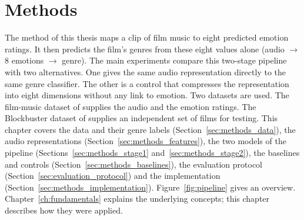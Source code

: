 \chapter{Methods}
\label{ch:methods}

The method of this thesis maps a clip of film music to eight predicted emotion ratings. It then predicts the film's genres from these eight values alone (audio $\rightarrow$ 8 emotions $\rightarrow$ genre). The main experiments compare this two-stage pipeline with two alternatives. One gives the same audio representation directly to the same genre classifier. The other is a control that compresses the representation into eight dimensions without any link to emotion. Two datasets are used. The film-music dataset of \citet{eerola2011comparison} supplies the audio and the emotion ratings. The Blockbuster dataset of \citet{ma2021computational} supplies an independent set of films for testing. This chapter covers the data and their genre labels (Section~\ref{sec:methods_data}), the audio representations (Section~\ref{sec:methods_features}), the two models of the pipeline (Sections~\ref{sec:methods_stage1} and~\ref{sec:methods_stage2}), the baselines and controls (Section~\ref{sec:methods_baselines}), the evaluation protocol (Section~\ref{sec:evaluation_protocol}) and the implementation (Section~\ref{sec:methods_implementation}). Figure~\ref{fig:pipeline} gives an overview. Chapter~\ref{ch:fundamentals} explains the underlying concepts; this chapter describes how they were applied.

